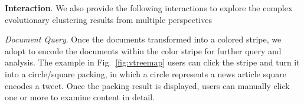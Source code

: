 \noindent \textbf{\normalsize Interaction}.
We also provide the following interactions to explore the complex evolutionary clustering results from multiple perspectives 

\emph{\normalsize Document Query}.
Once the documents  transformed into a colored stripe, we adopt  to encode the documents  within the color stripe for further query and analysis.
The example in  Fig.~\ref{fig:vtreemap}  users can click the stripe and turn it into a circle/square packing, in which a circle represents a news article  square encodes a tweet.
Once the packing result is displayed, users can manually click one or more  to examine  content in detail.

